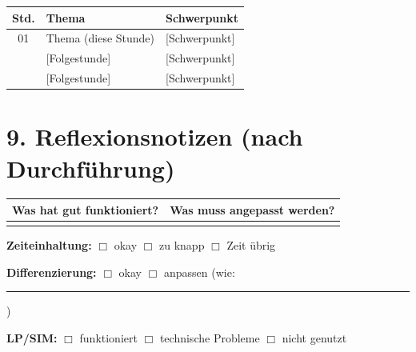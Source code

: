 \documentclass[11pt, a4paper]{article}
\newcommand{\thema}{Thema}
\newcommand{\stunde}{01}
\begin{document}
\begin{tabular}{|c|l|l|}
\hline
\textbf{Std.} & \textbf{Thema} & \textbf{Schwerpunkt} \\
\hline
\stunde & \thema{} (diese Stunde) & [Schwerpunkt] \\
\hline
[\stunde+1] & [Folgestunde] & [Schwerpunkt] \\
\hline
[\stunde+2] & [Folgestunde] & [Schwerpunkt] \\
\hline
\end{tabular}


\section*{9. Reflexionsnotizen (nach Durchführung)}

\begin{tabular}{|p{7cm}|p{7cm}|}
\hline
\textbf{Was hat gut funktioniert?} & \textbf{Was muss angepasst werden?} \\
\hline
& \\[3cm]
\hline
\end{tabular}

\vspace{1em}

\textbf{Zeiteinhaltung:} $\Box$ okay \quad $\Box$ zu knapp \quad $\Box$ Zeit übrig

\textbf{Differenzierung:} $\Box$ okay \quad $\Box$ anpassen (wie: \rule{5cm}{0.4pt})

\textbf{LP/SIM:} $\Box$ funktioniert \quad $\Box$ technische Probleme \quad $\Box$ nicht genutzt
\end{document}
